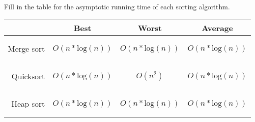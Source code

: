 Fill in the table for the asymptotic running time of each sorting
      algorithm.
      \begin{center}
      \begin{tabular}{|r|c|c|c|}
        \hline
        ~ & Best & Worst & Average \\\hline
        Merge sort &
            \begin{answer}$O(n*\textrm{log}(n))$\end{answer} &
            \begin{answer}$O(n*\textrm{log}(n))$\end{answer} &
            \begin{answer}$O(n*\textrm{log}(n))$\end{answer} \\\hline
        Quicksort &
            \begin{answer}$O(n*\textrm{log}(n))$\end{answer} &
            \begin{answer}$O(n^2)$\end{answer} &
            \begin{answer}$O(n*\textrm{log}(n))$\end{answer} \\\hline
        Heap sort &
            \begin{answer}$O(n*\textrm{log}(n))$\end{answer} &
            \begin{answer}$O(n*\textrm{log}(n))$\end{answer} &
            \begin{answer}$O(n*\textrm{log}(n))$\end{answer} \\\hline
      \end{tabular}
      \end{center}
